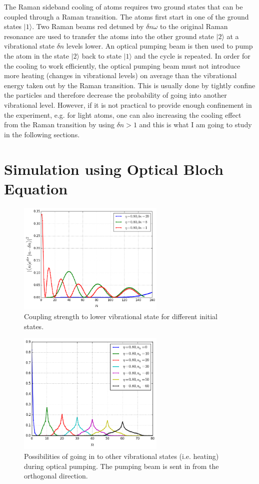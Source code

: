 \documentclass[aps,twocolumn,secnumarabic,balancelastpage,amsmath,amssymb,nofootinbib]{revtex4}
\begin{document}
The Raman sideband cooling of atoms requires two ground states that can be coupled through a Raman transition. The atoms first start in one of the ground states $|1\rangle$. Two Raman beams red detuned by $\delta n\omega$ to the original Raman resonance are used to transfer the atoms into the other ground state $|2\rangle$ at a vibrational state $\delta n$ levels lower. An optical pumping beam is then used to pump the atom in the state $|2\rangle$ back to state $|1\rangle$ and the cycle is repeated. In order for the cooling to work efficiently, the optical pumping beam must not introduce more heating (changes in vibrational levels) on average than the vibrational energy taken out by the Raman transition. This is usually done by tightly confine the particles and therefore decrease the probability of going into another vibrational level. However, if it is not practical to provide enough confinement in the experiment, e.g. for light atoms, one can also increasing the cooling effect from the Raman transition by using $\delta n>1$ and this is what I am going to study in the following sections.

\section{Simulation using Optical Bloch Equation}
\begin{figure}
  \begin{center}
    \includegraphics[width=7cm]{../raman_0.8_1.png}
  \end{center}
  \caption{Coupling strength to lower vibrational state for different initial states.}
  \label{fig-raman-curve}
\end{figure}
\begin{figure}
  \begin{center}
    \includegraphics[width=7cm]{../pump_0.8_0_curve.png}
  \end{center}
  \caption{Possibilities of going in to other vibrational states (i.e. heating) during optical pumping. The pumping beam is sent in from the orthogonal direction.}
  \label{fig-pump-curve}
\end{figure}
\end{document}
